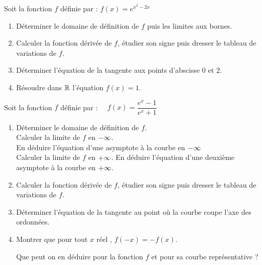 \begin{exercice}

 Soit  la fonction $ f $  définie par : $ f(x)= e^{x^{2}-2x} $
   \begin{enumerate}
   \item Déterminer le domaine de définition de $ f $  puis les limites  aux bornes.
   \item Calculer  la fonction dérivée de $ f $, étudier son signe puis dresser le tableau de variations de $ f $.
   \item Déterminer  l'équation de la tangente aux points d'abscisse $0 $ et $2 $.
   \item Résoudre dans $ \mathbb{R} $ l'équation $ f(x)=1. $
   \end{enumerate}
\end{exercice}


\begin{exercice}
 Soit  la fonction $ f $  définie par :~~ $ f(x)= \dfrac{e^{x}-1}{e^{x}+1} $
   \begin{enumerate}
   \item Déterminer le domaine de définition de $ f $.\\ Calculer la limite de $ f $  en $ -\infty $.\\
   En déduire l'équation d'une asymptote à la courbe en $ -\infty $ \\ Calculer la limite de $ f $  en $ +\infty $.
   En déduire l'équation d'une  deuxième  asymptote à la courbe en $ +\infty $.
   \item Calculer  la fonction dérivée de $ f $, étudier son signe puis dresser le tableau de variations de $ f $.
   \item Déterminer  l'équation de la tangente au point où la courbe coupe l'axe des ordonnées.
   \item  Montrer que pour tout $ x $ réel ,  $ f(-x)=-f(x). $ 
   
   Que peut on en déduire pour la fonction $ f $  et pour sa courbe représentative ?

   \end{enumerate}
\end{exercice}


